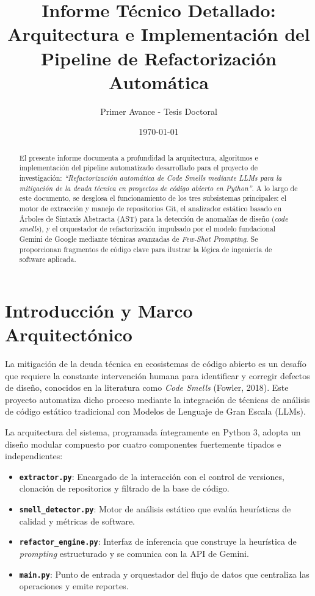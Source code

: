 \documentclass[12pt,a4paper]{article}
\title{\textbf{Informe Técnico Detallado: Arquitectura e Implementación del Pipeline de Refactorización Automática}}
\author{Primer Avance - Tesis Doctoral}
\date{\today}
\begin{document}
\maketitle
\tableofcontents
\newpage

\begin{abstract}
El presente informe documenta a profundidad la arquitectura, algoritmos e implementación del pipeline automatizado desarrollado para el proyecto de investigación: \textit{``Refactorización automática de Code Smells mediante LLMs para la mitigación de la deuda técnica en proyectos de código abierto en Python''}. A lo largo de este documento, se desglosa el funcionamiento de los tres subsistemas principales: el motor de extracción y manejo de repositorios Git, el analizador estático basado en Árboles de Sintaxis Abstracta (AST) para la detección de anomalías de diseño (\textit{code smells}), y el orquestador de refactorización impulsado por el modelo fundacional Gemini de Google mediante técnicas avanzadas de \textit{Few-Shot Prompting}. Se proporcionan fragmentos de código clave para ilustrar la lógica de ingeniería de software aplicada.
\end{abstract}

\section{Introducción y Marco Arquitectónico}

La mitigación de la deuda técnica en ecosistemas de código abierto es un desafío que requiere la constante intervención humana para identificar y corregir defectos de diseño, conocidos en la literatura como \textit{Code Smells} (Fowler, 2018). Este proyecto automatiza dicho proceso mediante la integración de técnicas de análisis de código estático tradicional con Modelos de Lenguaje de Gran Escala (LLMs).

La arquitectura del sistema, programada íntegramente en Python 3, adopta un diseño modular compuesto por cuatro componentes fuertemente tipados e independientes:
\begin{itemize}
    \item \textbf{\texttt{extractor.py}}: Encargado de la interacción con el control de versiones, clonación de repositorios y filtrado de la base de código.
    \item \textbf{\texttt{smell\_detector.py}}: Motor de análisis estático que evalúa heurísticas de calidad y métricas de software.
    \item \textbf{\texttt{refactor\_engine.py}}: Interfaz de inferencia que construye la heurística de \textit{prompting} estructurado y se comunica con la API de Gemini.
    \item \textbf{\texttt{main.py}}: Punto de entrada y orquestador del flujo de datos que centraliza las operaciones y emite reportes.
\end{itemize}
\end{document}
